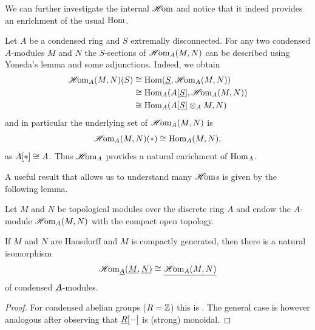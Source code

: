 %	

We can further investigate the internal ${\operatorname{\mathscr{H}\!om}}$ and notice that it indeed provides an enrichment of the usual ${\operatorname{Hom}}$.
\begin{remark}
	\label{remark: internal Homs are enriched}
	
	Let $A$ be a condensed ring and $S$ extremally disconnected. For any two condensed $A$-modules $M$ and $N$ the $S$-sections of ${\operatorname{\mathscr{H}\!om}}_A(M, N)$ can be described using Yoneda's lemma and some adjunctions. Indeed, we obtain
	\begin{align*}
		{\operatorname{\mathscr{H}\!om}}_A(M, N)(S) &\cong {\operatorname{Hom}}(\underline{S}, {\operatorname{\mathscr{H}\!om}}_A(M, N))\\
		&\cong {\operatorname{Hom}}_A({A[\underline{S}]}, {\operatorname{\mathscr{H}\!om}}_A(M, N))\\
		&\cong {\operatorname{Hom}}_A({A[\underline{S}]}\otimes_A M, N)
	\end{align*}
	and in particular the underlying set of ${\operatorname{\mathscr{H}\!om}}_A(M, N)$ is
		$${\operatorname{\mathscr{H}\!om}}_A(M, N)(\ast)\cong {\operatorname{Hom}}_A(M, N),$$
	as ${A[\ast]} \cong A$. Thus ${\operatorname{\mathscr{H}\!om}}_A$ provides a natural enrichment of ${\operatorname{Hom}}_A$.
\end{remark}

A useful result that allows us to understand many ${\operatorname{\mathscr{H}\!om}}$s is given by the following lemma.
\begin{lemma}
	\label{lemma: internal hom -- but explicit}
	
	Let $M$ and $N$ be topological modules over the discrete ring $A$ and endow the $A$-module ${\operatorname{\mathscr{H}\!om}}_A(M, N)$ with the compact open topology.
	
	If $M$ and $N$ are Hausdorff and $M$ is compactly generated, then there is a natural isomorphism
		$${\operatorname{\mathscr{H}\!om}}_{\underline{A}}(\underline{M}, \underline{N}) \cong \underline{{\operatorname{\mathscr{H}\!om}}_A(M, N)}$$
	of condensed $\underline{A}$-modules.
\end{lemma}
\begin{proof}
	For condensed abelian groups (\ie $R={\mathbb{Z}}$) this is \cite[Prop. 4.2]{condenseddotpdf}. The general case is however analogous after observing that ${\underline{R}[-]}$ is (strong) monoidal. 
\end{proof}

